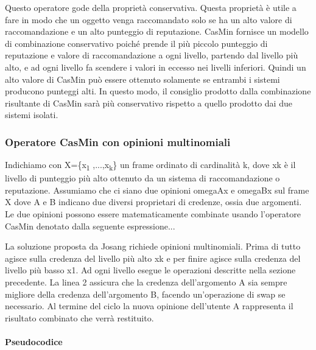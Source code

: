 \documentclass{report}
\begin{document}
	Questo operatore gode della proprietà conservativa. Questa proprietà è
	utile a fare in modo che un oggetto venga raccomandato solo se ha un
	alto valore di raccomandazione e un alto punteggio di reputazione.
	CasMin fornisce un modello di combinazione conservativo poiché prende il
	più piccolo punteggio di reputazione e valore di raccomandazione a ogni
	livello, partendo dal livello più alto, e ad ogni livello fa scendere i
	valori in eccesso nei livelli inferiori. Quindi un alto valore di CasMin
	può essere ottenuto solamente se entrambi i sistemi producono punteggi
	alti. In questo modo, il consiglio prodotto dalla combinazione
	risultante di CasMin sarà più conservativo rispetto a quello prodotto
	dai due sistemi isolati.
	
	\hypertarget{header-n151}{%
		\subsubsection{Operatore CasMin con opinioni
			multinomiali}\label{header-n151}}
	
	Indichiamo con X=\{x\textsubscript{1} ,...,x\textsubscript{k}\} un frame
	ordinato di cardinalità k, dove xk è il livello di punteggio più alto
	ottenuto da un sistema di raccomandazione o reputazione. Assumiamo che
	ci siano due opinioni omegaAx e omegaBx sul frame X dove A e B indicano
	due diversi proprietari di credenze, ossia due argomenti. Le due
	opinioni possono essere matematicamente combinate usando l'operatore
	CasMin denotato dalla seguente espressione...
	
	La soluzione proposta da Josang richiede opinioni multinomiali. Prima di
	tutto agisce sulla credenza del livello più alto xk e per finire agisce
	sulla credenza del livello più basso x1. Ad ogni livello esegue le
	operazioni descritte nella sezione precedente. La linea 2 assicura che
	la credenza dell'argomento A sia sempre migliore della credenza
	dell'argomento B, facendo un'operazione di swap se necessario. Al
	termine del ciclo la nuova opinione dell'utente A rappresenta il
	risultato combinato che verrà restituito.
	
	\hypertarget{header-n156}{%
		\paragraph{Pseudocodice}\label{header-n156}}
	
\end{document}
